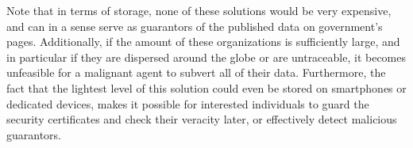 Note that in terms of storage, none of these solutions would be very expensive, and can in a sense serve as guarantors of the published data on government's pages. Additionally, if the amount of these organizations is sufficiently large, and in particular if they are dispersed around the globe or are untraceable, it becomes unfeasible for a malignant agent to subvert all of their data. Furthermore, the fact that the lightest level of this solution could even be stored on smartphones or dedicated devices, makes it possible for interested individuals to guard the security certificates and check their veracity later, or effectively detect malicious guarantors.